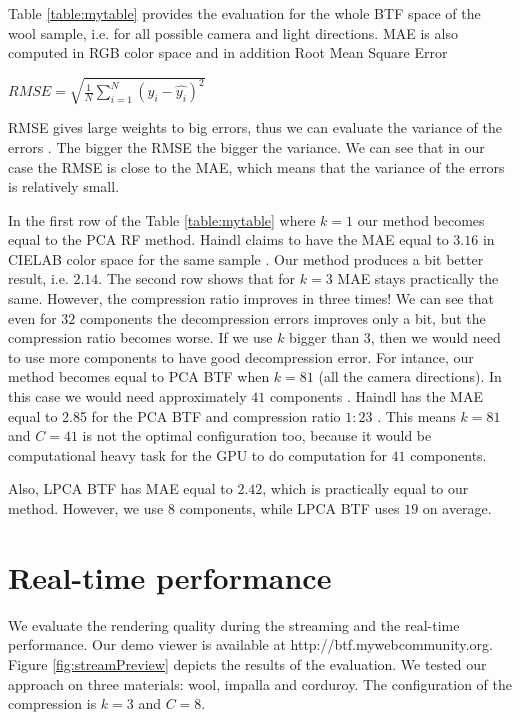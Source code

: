 Table \ref{table:mytable} provides the evaluation for the whole BTF space of the wool sample, i.e. for all possible camera and light directions.
 MAE is also computed in RGB color space and in addition Root Mean Square Error
 
 {\centering $RMSE = \sqrt{\frac{1}{N}\sum_{i=1}^{N}(y_i-\hat{y_i} )^2}$\\}

 RMSE gives large weights to big errors, thus we can evaluate the variance of the errors \cite{rmse}.
 The bigger the RMSE the bigger the variance. We can see that in our case the RMSE is close to the MAE, which means that the variance of the errors is relatively small.
 
In the first row of the  Table \ref{table:mytable} where $k=1$ our method becomes equal to the PCA RF \cite{haindl} method.
Haindl claims to have the MAE equal to $3.16$ in CIELAB color space for the same sample \cite{haindl}.
 Our method produces a bit better result, i.e. $2.14$. 
 The second row shows that for  $k=3$ MAE stays practically the same. 
 However, the compression ratio improves in three times!
 We can see that even for $32$ components the decompression errors improves only a bit, but the compression ratio becomes worse.
 If we use $k$ bigger than $3$, then we would need to use more components to have good decompression error.
 For intance, our method becomes equal to PCA BTF \cite{haindl} when $k=81$ (all the camera directions). In this case we would need approximately $41$ components \cite{haindl}.
 Haindl has the MAE equal to 2.85 for the PCA BTF and compression ratio $1:23$ \cite{haindl}. 
 This means  $k=81$ and $C=41$ is not the optimal configuration too, because it would be computational heavy task for the GPU to do computation for $41$ components.
 
 Also, LPCA BTF \cite{haindl} has MAE equal to $2.42$, which is practically equal to our method. 
 However, we use $8$ components, while LPCA BTF uses $19$ on average.
 
 

\section{Real-time performance}
\label{section:eval_streaming}

We evaluate the rendering quality during the streaming and the real-time performance.
Our demo viewer is available at  http://btf.mywebcommunity.org. 
Figure \ref{fig:streamPreview} depicts the results of the evaluation.
We tested our approach on three materials: wool, impalla and corduroy.
The configuration of the compression is $k=3$ and $C=8$.

